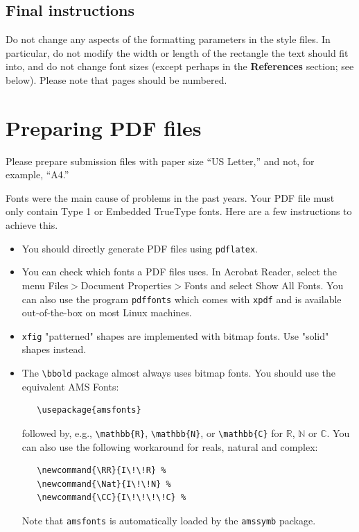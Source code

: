 \documentclass{article}
\begin{document}
\subsection{Final instructions}

Do not change any aspects of the formatting parameters in the style files.  In
particular, do not modify the width or length of the rectangle the text should
fit into, and do not change font sizes (except perhaps in the
\textbf{References} section; see below). Please note that pages should be
numbered.


\section{Preparing PDF files}


Please prepare submission files with paper size ``US Letter,'' and not, for
example, ``A4.''


Fonts were the main cause of problems in the past years. Your PDF file must only
contain Type 1 or Embedded TrueType fonts. Here are a few instructions to
achieve this.


\begin{itemize}


\item You should directly generate PDF files using \verb+pdflatex+.


\item You can check which fonts a PDF files uses.  In Acrobat Reader, select the
  menu Files$>$Document Properties$>$Fonts and select Show All Fonts. You can
  also use the program \verb+pdffonts+ which comes with \verb+xpdf+ and is
  available out-of-the-box on most Linux machines.


\item \verb+xfig+ "patterned" shapes are implemented with bitmap fonts.  Use
  "solid" shapes instead.


\item The \verb+\bbold+ package almost always uses bitmap fonts.  You should use
  the equivalent AMS Fonts:
\begin{verbatim}
   \usepackage{amsfonts}
\end{verbatim}
followed by, e.g., \verb+\mathbb{R}+, \verb+\mathbb{N}+, or \verb+\mathbb{C}+
for $\mathbb{R}$, $\mathbb{N}$ or $\mathbb{C}$.  You can also use the following
workaround for reals, natural and complex:
\begin{verbatim}
   \newcommand{\RR}{I\!\!R} %
   \newcommand{\Nat}{I\!\!N} %
   \newcommand{\CC}{I\!\!\!\!C} %
\end{verbatim}
Note that \verb+amsfonts+ is automatically loaded by the \verb+amssymb+ package.


\end{itemize}
\end{document}
